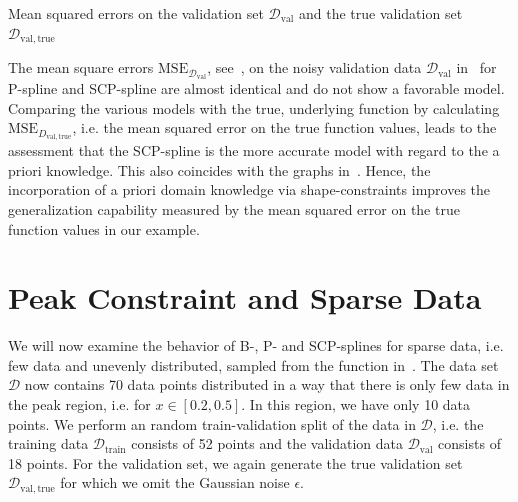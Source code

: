 \begin{table}[H]
	\begin{center}
	\end{center}
	\caption{Mean squared errors on the validation set $\mathcal{D}_{\text{val}}$ and the true validation set $\mathcal{D}_{\mathrm{val}, \mathrm{true}}$}
	\label{tab:test-func-peak-mses}
\end{table}
%
The mean square errors $\mathrm{MSE}_{\mathcal{D}_{\mathrm{val}}}$, see~, on the noisy validation data $\mathcal{D}_{\mathrm{val}}$ in~ for P-spline and SCP-spline are almost identical and do not show a favorable model. Comparing the various models with the true, underlying function by calculating $\text{MSE}_{D_{\mathrm{val},\mathrm{true}}}$, i.e. the mean squared error on the true function values, leads to the assessment that the SCP-spline is the more accurate model with regard to the a priori knowledge. This also coincides with the graphs in~. Hence, the incorporation of a priori domain knowledge via shape-constraints improves the generalization capability measured by the mean squared error on the true function values in our example. 

\section{Peak Constraint and Sparse Data} \label{sec:peak-behav-sparse}

We will now examine the behavior of B-, P- and SCP-splines for sparse data, i.e. few data and unevenly distributed, sampled from the function in~. The data set $\mathcal{D}$ now contains 70 data points distributed in a way that there is only few data in the peak region, i.e. for $x \in [0.2, 0.5]$. In this region, we have only 10 data points. We perform an random train-validation split of the data in $\mathcal{D}$, i.e. the training data $\mathcal{D}_{\text{train}}$ consists of 52 points and the validation data $\mathcal{D}_{\text{val}}$ consists of 18 points. For the validation set, we again generate the true validation set $\mathcal{D}_{\mathrm{val}, \mathrm{true}}$ for which we omit the Gaussian noise $\epsilon$.


